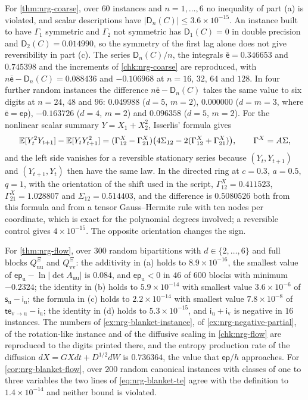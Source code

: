 \begin{numcheck}
For \cref{thm:nrg-coarse}, over $60$ instances and $n=1,\dots,6$ no inequality of part (a) is violated, and scalar descriptions have $\vert\mathsf D_n(C)\vert\le3.6\times10^{-15}$. An instance built to have $\Gamma_1$ symmetric and $\Gamma_2$ not symmetric has $\mathsf D_1(C)=0$ in double precision and $\mathsf D_2(C)=0.014990$, so the symmetry of the first lag alone does not give reversibility in part (c). The series $\mathsf D_n(C)/n$, the integrals $\bar{\mathsf e}=0.346653$ and $0.745398$ and the increments of \cref{chk:nrg-coarse} are reproduced, with $n\bar{\mathsf e}-\mathsf D_n(C)=0.088436$ and $-0.106968$ at $n=16$, $32$, $64$ and $128$. In four further random instances the difference $n\bar{\mathsf e}-\mathsf D_n(C)$ takes the same value to six digits at $n=24$, $48$ and $96$: $0.049988$ ($d=5$, $m=2$), $0.000000$ ($d=m=3$, where $\bar{\mathsf e}=\mathsf{ep}$), $-0.163726$ ($d=4$, $m=2$) and $0.096358$ ($d=5$, $m=2$). For the nonlinear scalar summary $Y=X_1+X_2^2$, Isserlis' formula gives
\[
\mathbb{E}[Y_t^2Y_{t+1}]-\mathbb{E}[Y_tY_{t+1}^2]=(\Gamma^X_{12}-\Gamma^X_{21})\bigl(4\Sigma_{12}-2(\Gamma^X_{12}+\Gamma^X_{21})\bigr),\qquad\Gamma^X=A\Sigma,
\]
and the left side vanishes for a reversible stationary series because $(Y_t,Y_{t+1})$ and $(Y_{t+1},Y_t)$ then have the same law. In the directed ring at $c=0.3$, $a=0.5$, $q=1$, with the orientation of the shift used in the script, $\Gamma^X_{12}=0.411523$, $\Gamma^X_{21}=1.028807$ and $\Sigma_{12}=0.514403$, and the difference is $0.5080526$ both from this formula and from a tensor Gauss--Hermite rule with ten nodes per coordinate, which is exact for the polynomial degrees involved; a reversible control gives $4\times10^{-15}$. The opposite orientation changes the sign.

For \cref{thm:nrg-flow}, over $300$ random bipartitions with $d\in\{2,\dots,6\}$ and full blocks $Q^{\Xi}_{\mathrm{uu}}$ and $Q^{\Xi}_{\mathrm{vv}}$: the additivity in (a) holds to $8.9\times10^{-16}$, the smallest value of $\mathsf{ep}_{\mathrm u}-\ln\vert\det A_{\mathrm{uu}}\vert$ is $0.084$, and $\mathsf{ep}_{\mathrm u}<0$ in $46$ of $600$ blocks with minimum $-0.2324$; the identity in (b) holds to $5.9\times10^{-14}$ with smallest value $3.6\times10^{-6}$ of $\mathsf s_{\mathrm u}-\mathsf i_{\mathrm u}$; the formula in (c) holds to $2.2\times10^{-14}$ with smallest value $7.8\times10^{-8}$ of $\mathsf{te}_{\mathrm v\to\mathrm u}-\mathsf i_{\mathrm u}$; the identity in (d) holds to $5.3\times10^{-15}$, and $\mathsf i_{\mathrm u}+\mathsf i_{\mathrm v}$ is negative in $16$ instances. The numbers of \cref{ex:nrg-blanket-instance}, of \cref{ex:nrg-negative-partial}, of the rotation-like instance and of the diffusive scaling in \cref{chk:nrg-flow} are reproduced to the digits printed there, and the entropy production rate of the diffusion $dX=GXdt+D^{1/2}dW$ is $0.736364$, the value that $\mathsf{ep}/h$ approaches. For \cref{cor:nrg-blanket-flow}, over $200$ random canonical instances with classes of one to three variables the two lines of \cref{eq:nrg-blanket-te} agree with the definition to $1.4\times10^{-14}$ and neither bound is violated.


\end{numcheck}
